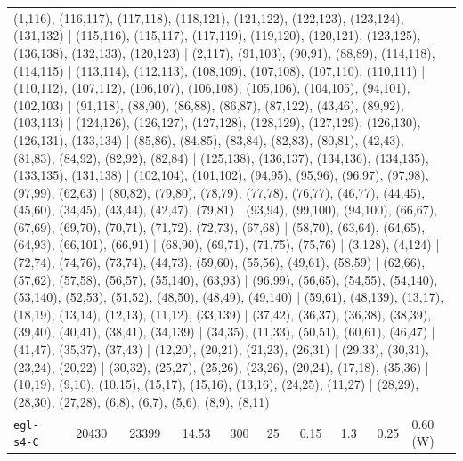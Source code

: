 \begin{longtable}{lrrrrrrrrl}
\multicolumn{10}{p{0.96\linewidth}}{\tiny\raggedright\arraybackslash (1,116), (116,117), (117,118), (118,121), (121,122), (122,123), (123,124), (131,132) | (115,116), (115,117), (117,119), (119,120), (120,121), (123,125), (136,138), (132,133), (120,123) | (2,117), (91,103), (90,91), (88,89), (114,118), (114,115) | (113,114), (112,113), (108,109), (107,108), (107,110), (110,111) | (110,112), (107,112), (106,107), (106,108), (105,106), (104,105), (94,101), (102,103) | (91,118), (88,90), (86,88), (86,87), (87,122), (43,46), (89,92), (103,113) | (124,126), (126,127), (127,128), (128,129), (127,129), (126,130), (126,131), (133,134) | (85,86), (84,85), (83,84), (82,83), (80,81), (42,43), (81,83), (84,92), (82,92), (82,84) | (125,138), (136,137), (134,136), (134,135), (133,135), (131,138) | (102,104), (101,102), (94,95), (95,96), (96,97), (97,98), (97,99), (62,63) | (80,82), (79,80), (78,79), (77,78), (76,77), (46,77), (44,45), (45,60), (34,45), (43,44), (42,47), (79,81) | (93,94), (99,100), (94,100), (66,67), (67,69), (69,70), (70,71), (71,72), (72,73), (67,68) | (58,70), (63,64), (64,65), (64,93), (66,101), (66,91) | (68,90), (69,71), (71,75), (75,76) | (3,128), (4,124) | (72,74), (74,76), (73,74), (44,73), (59,60), (55,56), (49,61), (58,59) | (62,66), (57,62), (57,58), (56,57), (55,140), (63,93) | (96,99), (56,65), (54,55), (54,140), (53,140), (52,53), (51,52), (48,50), (48,49), (49,140) | (59,61), (48,139), (13,17), (18,19), (13,14), (12,13), (11,12), (33,139) | (37,42), (36,37), (36,38), (38,39), (39,40), (40,41), (38,41), (34,139) | (34,35), (11,33), (50,51), (60,61), (46,47) | (41,47), (35,37), (37,43) | (12,20), (20,21), (21,23), (26,31) | (29,33), (30,31), (23,24), (20,22) | (30,32), (25,27), (25,26), (23,26), (20,24), (17,18), (35,36) | (10,19), (9,10), (10,15), (15,17), (15,16), (13,16), (24,25), (11,27) | (28,29), (28,30), (27,28), (6,8), (6,7), (5,6), (8,9), (8,11)} \\[2pt]
\texttt{egl-s4-C} & 20430 & 23399 & 14.53 & 300 & 25 & 0.15 & 1.3 & 0.25 & 0.60\,(W) \\

\end{longtable}
